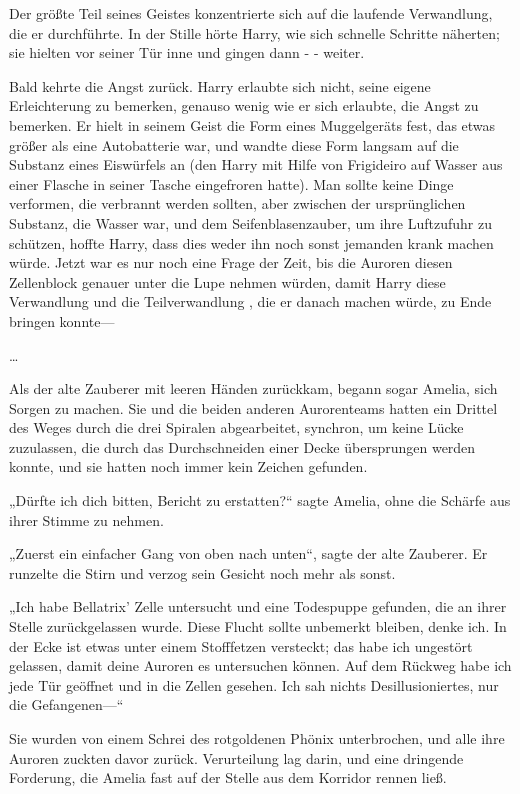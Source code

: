 {Der größte Teil seines Geistes konzentrierte sich auf die laufende Verwandlung, die er durchführte. In der Stille hörte Harry, wie sich schnelle Schritte näherten; sie hielten vor seiner Tür inne und gingen dann - - weiter.

Bald kehrte die Angst zurück. Harry erlaubte sich nicht, seine eigene Erleichterung zu bemerken, genauso wenig wie er sich erlaubte, die Angst zu bemerken. Er hielt in seinem Geist die Form eines Muggelgeräts fest, das etwas größer als eine Autobatterie war, und wandte diese Form langsam auf die Substanz eines Eiswürfels an (den Harry mit Hilfe von Frigideiro auf Wasser aus einer Flasche in seiner Tasche eingefroren hatte). Man sollte keine Dinge verformen, die verbrannt werden sollten, aber zwischen der ursprünglichen Substanz, die Wasser war, und dem Seifenblasenzauber, um ihre Luftzufuhr zu schützen, hoffte Harry, dass dies weder ihn noch sonst jemanden krank machen würde. Jetzt war es nur noch eine Frage der Zeit, bis die Auroren diesen Zellenblock genauer unter die Lupe nehmen würden, damit Harry diese Verwandlung und die Teilverwandlung , die er danach machen würde, zu Ende bringen konnte—

…

Als der alte Zauberer mit leeren Händen zurückkam, begann sogar Amelia, sich Sorgen zu machen. Sie und die beiden anderen Aurorenteams hatten ein Drittel des Weges durch die drei Spiralen abgearbeitet, synchron, um keine Lücke zuzulassen, die durch das Durchschneiden einer Decke übersprungen werden konnte, und sie hatten noch immer kein Zeichen gefunden.

„Dürfte ich dich bitten, Bericht zu erstatten?“ sagte Amelia, ohne die Schärfe aus ihrer Stimme zu nehmen.

„Zuerst ein einfacher Gang von oben nach unten“, sagte der alte Zauberer. Er runzelte die Stirn und verzog sein Gesicht noch mehr als sonst.

„Ich habe Bellatrix' Zelle untersucht und eine Todespuppe gefunden, die an ihrer Stelle zurückgelassen wurde. Diese Flucht sollte unbemerkt bleiben, denke ich. In der Ecke ist etwas unter einem Stofffetzen versteckt; das habe ich ungestört gelassen, damit deine Auroren es untersuchen können. Auf dem Rückweg habe ich jede Tür geöffnet und in die Zellen gesehen. Ich sah nichts Desillusioniertes, nur die Gefangenen—“

Sie wurden von einem Schrei des rotgoldenen Phönix unterbrochen, und alle ihre Auroren zuckten davor zurück. Verurteilung lag darin, und eine dringende Forderung, die Amelia fast auf der Stelle aus dem Korridor rennen ließ.

}
